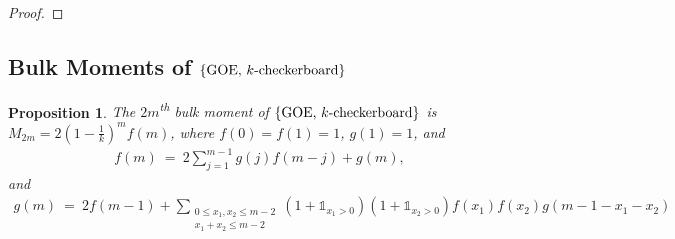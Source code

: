 \documentclass[11pt,reqno]{amsart}
\numberwithin{equation}{section}
\theoremstyle{plain}
\newtheorem{proposition}[thm]{Proposition}
\begin{document}
\begin{proof}
\end{proof}

\subsection{Bulk Moments of $\{\textup{GOE, }k\textup{-checkerboard}\}$}

\begin{proposition}\label{bulkGOEcheckerboard} The $2m$\textsuperscript{th} bulk moment of $\{\textup{GOE, }k\textup{-checkerboard}\}$ is $M_{2m}=2(1-\frac{1}{k})^mf(m)$, where $f(0)=f(1)=1$, $g(1)=1$, and
\begin{align}
f(m) \ = \ 2\sum_{j=1}^{m-1}g(j)f(m-j) + g(m),
\end{align}
and 
\begin{align}
g(m) \ = \ 2f(m-1) + \sum_{\substack{0\leq x_1,x_2\leq m-2\\ x_1+x_2\leq m-2}}(1+\mathbb{1}_{x_1>0})(1+\mathbb{1}_{x_2>0})f(x_1)f(x_2)g(m-1-x_1-x_2)
\end{align}
\end{proposition}
\end{document}
